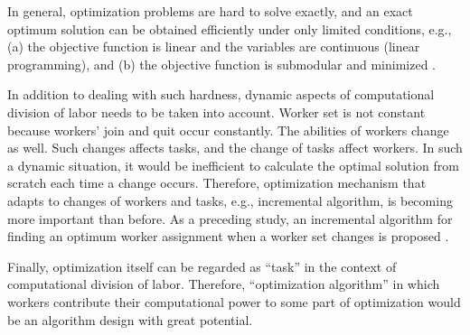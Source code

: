 In general, optimization problems are hard to solve exactly, and an
exact optimum solution can be obtained efficiently under only limited
conditions, e.g., (a) the objective function is linear and the
variables are continuous (linear programming), and (b) the objective
function is submodular and minimized \cite{Orl09}.

In addition to dealing with such hardness, dynamic aspects of
computational division of labor needs to be taken into account.
Worker set is not constant because workers' join and quit occur
constantly. The abilities of workers change as well. Such changes
affects tasks, and the change of tasks affect workers. In such a
dynamic situation, it would be inefficient to calculate the optimal
solution from scratch each time a change occurs. Therefore,
optimization mechanism that adapts to changes of workers and tasks,
e.g., incremental algorithm, is becoming more important than before.
As a preceding study, an incremental algorithm for finding an optimum
worker assignment when a worker set changes is proposed
\cite{RLT+15}.

Finally, optimization itself can be regarded as ``task'' in the
context of computational division of labor. Therefore, ``optimization
algorithm'' in which workers contribute their computational power to
some part of optimization would be an algorithm design with great
potential.




